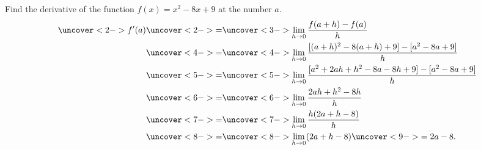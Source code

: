 \begin{frame}
\begin{example}[Example 4, p. 138]
Find the derivative of the function $f(x) = x^2 -8x + 9$ at the number $a$.
\abovedisplayskip=0pt
\belowdisplayskip=-15pt
\abovedisplayshortskip=0pt
\belowdisplayshortskip=0pt
\begin{align*}
\uncover<2->{f'(a)} & \uncover<2->{=}  %
\uncover<3->{\lim_{h\rightarrow 0}\frac{f(a+h)-f(a)}{h}}\\
 & \uncover<4->{=}  %
\uncover<4->{\lim_{h\rightarrow 0}\frac{[(a+h)^2-8(a+h)+9]-[a^2-8a+9]}{h}}\\
 & \uncover<5->{=}  %
\uncover<5->{\lim_{h\rightarrow 0}\frac{[a^2 + 2ah + h^2-8a-8h+9]-[a^2-8a+9]}{h}}\\
 & \uncover<6->{=}  %
\uncover<6->{\lim_{h\rightarrow 0}\frac{2ah + h^2-8h}{h}}\\
 & \uncover<7->{=}  %
\uncover<7->{\lim_{h\rightarrow 0}\frac{h(2a + h-8)}{h}}\\
 & \uncover<8->{=}  %
\uncover<8->{\lim_{h\rightarrow 0}(2a + h-8)} \uncover<9->{ = 2a-8.}
\end{align*}
\end{example}
\end{frame}
